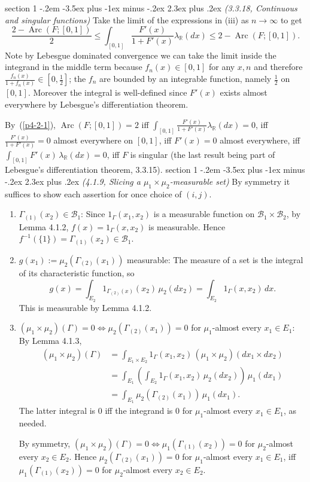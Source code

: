 \documentclass[12pt]{article}
\makeatletter
\theoremstyle{norm}
\newcommand{\R}[0]{\mathbb{R}}
\providecommand{\cal}[1]{\mathcal{#1}}
\renewcommand{\cal}[1]{\mathcal{#1}}
\newcommand{\rc}[1]{\frac{1}{#1}}
\newcommand{\Ga}[0]{\Gamma}
\newcommand{\la}[0]{\lambda}
\newcommand{\pa}[1]{\left( {#1} \right)}
\newcommand{\Arc}{\operatorname{Arc}}
\newcommand{\iy}[0]{\infty}
\newenvironment{problem}{\@startsection
       {section}
       {1}
       {-.2em}
       {-3.5ex plus -1ex minus -.2ex}
       {2.3ex plus .2ex}
       {\pagebreak[3]%
       \large\bf\noindent{Problem }
       }
       }
       {%
       }
\makeatother
\begin{document}
\begin{problem}{\it (3.3.18, Continuous and singular functions)}
Take the limit of the expressions in (iii) as $n\to \iy$ to get
\begin{equation}\label{p4-2-1}
\frac{2-\Arc(F;[0,1])}{2}\le \int_{[0,1]}\frac{F'(x)}{1+F'(x)}\la_{\R}(dx)\le 2-\Arc(F;[0,1]).
\end{equation}
Note by Lebesgue dominated convergence we can take the limit inside the integrand in the middle term because $f_n(x)\in [0,1]$ for any $x,n$ and therefore $\frac{f_n(x)}{1+f_n(x)}\in [0,\rc 2]$; the $f_n$ are bounded by an integrable function, namely $\rc2$ on $[0,1]$. Moreover the integral is well-defined since $F'(x)$ exists almost everywhere by Lebesgue's differentiation theorem.

By~(\ref{p4-2-1}), $\Arc(F;[0,1])=2$ iff $\int_{[0,1]}\frac{F'(x)}{1+F'(x)}\la_{\R}(dx)=0$, iff $\frac{F'(x)}{1+F'(x)}=0$ almost everywhere on $[0,1]$, iff $F'(x)=0$ almost everywhere, iff $\int_{[0,1]}F'(x)\,\la_{\R}(dx)=0$, iff $F$ is singular (the last result being part of Lebesgue's differentiation theorem, 3.3.15).
\end{problem}
\begin{problem}{\it (4.1.9, Slicing a $\mu_1\times \mu_2$-measurable set)}
By symmetry it suffices to show each assertion for once choice of $(i,j)$.
\begin{enumerate}
\item $\Ga_{(1)}(x_2)\in \cal B_1$: Since $1_{\Ga}(x_1,x_2)$ is a measurable function on $\cal B_1\times \cal B_2$, by Lemma 4.1.2, $f(x)=1_{\Ga}(x,x_2)$ is measurable. Hence $f^{-1}(\{1\})=\Ga_{(1)}(x_2)\in \cal B_1$.
\item $g(x_1):=\mu_2(\Ga_{(2)}(x_1))$ measurable: The measure of a set is the integral of its characteristic function, so
\[
g(x)=\int_{E_2} 1_{\Ga_{(2)}(x)}(x_2)\,\mu_2(dx_2)=\int_{E_2}1_{\Ga}(x,x_2)\,dx.\]
This is measurable by Lemma 4.1.2.
\item $(\mu_1\times \mu_2)(\Ga)=0\iff \mu_2(\Ga_{(2)}(x_1))=0$ for $\mu_1$-almost every $x_1\in E_1$: By Lemma 4.1.3,
\begin{align*}
(\mu_1\times\mu_2)(\Ga)&=
\int_{E_1\times E_2} 1_{\Ga}(x_1,x_2)\,(\mu_1\times \mu_2)(dx_1\times dx_2)\\
&=\int_{E_1}\pa{\int_{E_2} 1_{\Ga}(x_1,x_2)\,\mu_2(dx_2)}\,\mu_1(dx_1)\\
&=\int_{E_1}\mu_2(\Ga_{(2)}(x_1))\,\mu_1(dx_1).
\end{align*}
The latter integral is 0 iff the integrand is 0 for $\mu_1$-almost every $x_1\in E_1$, as needed.

By symmetry, $(\mu_1\times \mu_2)(\Ga)=0\iff \mu_1(\Ga_{(1)}(x_2))=0$ for $\mu_2$-almost every $x_2\in E_2$. Hence $\mu_2(\Ga_{(2)}(x_1))=0$ for $\mu_1$-almost every $x_1\in E_1$, iff $\mu_1(\Ga_{(1)}(x_2))=0$ for $\mu_2$-almost every $x_2\in E_2$.
\end{enumerate}
\end{problem}
\end{document}
